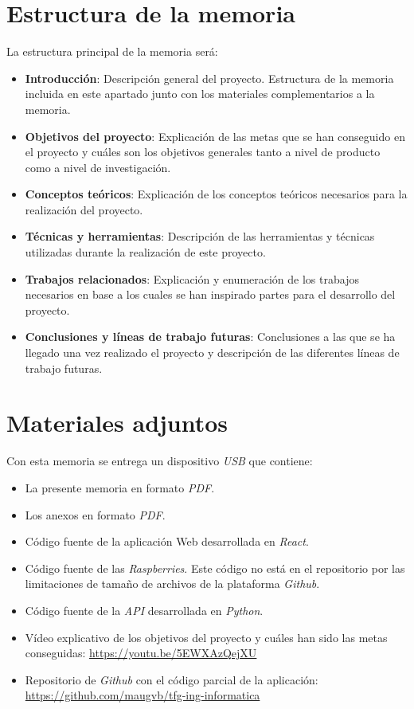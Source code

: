 \section{Estructura de la memoria}
La estructura principal de la memoria será:
\begin{itemize}
  \item \textbf{Introducción}: Descripción general del proyecto. Estructura de la memoria incluida en este apartado junto con los materiales complementarios a la memoria.
  \item \textbf{Objetivos del proyecto}: Explicación de las metas que se han conseguido en el proyecto y cuáles son los objetivos generales tanto a nivel de producto como a nivel de investigación.
  \item \textbf{Conceptos teóricos}: Explicación de los conceptos teóricos necesarios para la realización del proyecto.
  \item \textbf{Técnicas y herramientas}: Descripción de las herramientas y técnicas utilizadas durante la realización de este proyecto.
  \item \textbf{Trabajos relacionados}: Explicación y enumeración de los trabajos necesarios en base a los cuales se han inspirado partes para el desarrollo del proyecto.
  \item \textbf{Conclusiones y líneas de trabajo futuras}: Conclusiones a las que se ha llegado una vez realizado el proyecto y descripción de las diferentes líneas de trabajo futuras.
\end{itemize}
\section{Materiales adjuntos}
Con esta memoria se entrega un dispositivo \textit{USB} que contiene:

\begin{itemize}
  \item La presente memoria en formato \textit{PDF}.
  \item Los anexos en formato \textit{PDF}.
  \item Código fuente de la aplicación Web desarrollada en \textit{React}.
  \item Código fuente de las \textit{Raspberries}. Este código no está en el repositorio por las limitaciones de tamaño de archivos de la plataforma \textit{Github}.
  \item Código fuente de la \textit{API} desarrollada en \textit{Python}.
  \item Vídeo explicativo de los objetivos del proyecto y cuáles han sido las metas conseguidas: \url{https://youtu.be/5EWXAzQejXU}
  \item Repositorio de \textit{Github} con el código parcial de la aplicación: \url{https://github.com/maugvb/tfg-ing-informatica}
\end{itemize}

